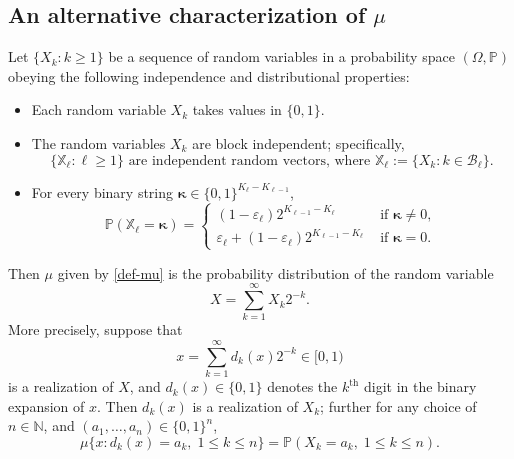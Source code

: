 \documentclass[12pt, twoside]{article}
\theoremstyle{definition}
\numberwithin{equation}{section}
\begin{document}
\subsection{An alternative characterization of $\mu$} \label{mu-X-section}
Let $\{X_k : k \geq 1\}$ be a sequence of random variables in a probability space $(\Omega, \mathbb P)$  obeying the following independence and distributional properties:
\begin{itemize} 
\item Each random variable $X_k$ takes values in $\{0,1\}$. 
\item The random variables $X_k$ are block independent; specifically,
\begin{equation} \label{independence-assumption}
\bigl\{ \mathbb X_{\ell} : \ell \geq 1 \bigr\} \text{ are independent random vectors, where } \mathbb X_{\ell} := \{X_k : k \in \mathcal B_{\ell} \}. 
\end{equation} 
\item For every binary string $\pmb{\kappa} \in \{0, 1\}^{K_{\ell}-K_{\ell-1}}$, 
\begin{equation}  \label{X-dist} 
\mathbb P(\mathbb X_{\ell} = \pmb{\kappa}) = \begin{cases} (1 - \varepsilon_{\ell}) 2^{K_{\ell-1} - K_{\ell}} &\text{ if } \pmb{\kappa} \ne 0, \\ \varepsilon_{\ell} + (1 - \varepsilon_{\ell}) 2^{K_{\ell-1} - K_{\ell}}  &\text{ if } \pmb{\kappa} = 0. \end{cases} 
\end{equation}  
\end{itemize} 
Then $\mu$ given by \eqref{def-mu} is the probability distribution of the random variable \[X = \sum_{k=1}^{\infty} X_k 2^{-k}. \] More precisely, suppose that 
 \begin{equation}  x = \sum_{k=1}^{\infty} d_k(x) 2^{-k}  \in [0,1) \label{dyadic-expansion-x} \end{equation}  is a realization of $X$, and $d_k(x) \in \{0, 1\}$ denotes the $k^{\text{th}}$ digit in the binary expansion of $x$. Then $d_k(x)$ is a realization of $X_k$; further for any choice of $n \in \mathbb N$, and $(a_1, \ldots, a_n) \in \{0, 1\}^n$, 
\begin{equation} \label{mu-and-P}
\mu \bigl\{x : d_k(x) = a_k, \; 1 \leq k \leq n \bigr\} = \mathbb P(X_k = a_k, \; 1 \leq k \leq n).
\end{equation}    
\end{document}
